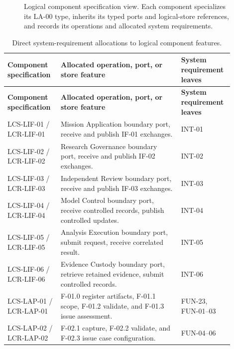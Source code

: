 \documentclass[11pt,a4paper]{article}
\begin{document}
\begin{figure}[H]
    \centering
    \resizebox{\linewidth}{!}{}
    \caption{Logical component specification view. Each component specializes its LA-00 type, inherits its typed ports and logical-store references, and records its operations and allocated system requirements.}
    \label{fig:framework-logical-component-specifications}
\end{figure}

\scriptsize
\begin{longtable}{>{\raggedright\arraybackslash}p{0.22\linewidth} >{\raggedright\arraybackslash}p{0.50\linewidth} >{\raggedright\arraybackslash}p{0.18\linewidth}}
    \caption{Direct system-requirement allocations to logical component features.}\label{tab:logical-component-requirement-allocation}\\
    \toprule
    \textbf{Component specification} & \textbf{Allocated operation, port, or store feature} & \textbf{System requirement leaves} \\
    \midrule
    \endfirsthead
    \toprule
    \textbf{Component specification} & \textbf{Allocated operation, port, or store feature} & \textbf{System requirement leaves} \\
    \midrule
    \endhead
    LCS-LIF-01 / LCR-LIF-01 & Mission Application boundary port, receive and publish IF-01 exchanges. & INT-01 \\
    LCS-LIF-02 / LCR-LIF-02 & Research Governance boundary port, receive and publish IF-02 exchanges. & INT-02 \\
    LCS-LIF-03 / LCR-LIF-03 & Independent Review boundary port, receive and publish IF-03 exchanges. & INT-03 \\
    LCS-LIF-04 / LCR-LIF-04 & Model Control boundary port, receive controlled records, publish controlled updates. & INT-04 \\
    LCS-LIF-05 / LCR-LIF-05 & Analysis Execution boundary port, submit request, receive correlated result. & INT-05 \\
    LCS-LIF-06 / LCR-LIF-06 & Evidence Custody boundary port, retrieve retained evidence, submit controlled records. & INT-06 \\
    LCS-LAP-01 / LCR-LAP-01 & F-01.0 register artifacts, F-01.1 scope, F-01.2 validate, and F-01.3 issue assessment. & FUN-23, FUN-01--03 \\
    LCS-LAP-02 / LCR-LAP-02 & F-02.1 capture, F-02.2 validate, and F-02.3 issue case configuration. & FUN-04--06 \\

\end{longtable}
\end{document}
